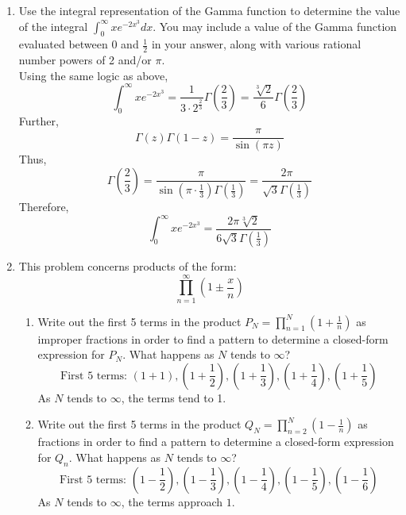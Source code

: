 \documentclass{article}
\begin{document}
\begin{enumerate}
    \[\]
    We derived in class that: 
    \[\int_{0}^{\infty} x^{m-1} e^{-ax^n}dx = \frac{1}{na^{\frac m n}}\Gamma\left(\frac{m}{n}\right)\]
    Plugging in, we get:
    \[\int_{0}^{\infty} x^{\frac 5 2} e^{-2x}dx = \frac{1}{1 \cdot 2^{\frac{7}{2}}}\Gamma\left(\frac{7}{2}\right) = \frac{1}{8\sqrt 2} \cdot \frac 5 2 \cdot \frac 3 2 \cdot \frac  1 2 \cdot \Gamma \left( \frac 1 2 \right) = \boxed{\frac{15\sqrt{\pi}}{64 \sqrt 2}}\]
    \item Use the integral representation of the Gamma function to determine the value of the integral $\int_{0}^{\infty} xe^{-2x^3}dx$. You may include a value of the Gamma function evaluated between $0$ and $\frac{1}{2}$ in your answer, along with various rational number powers of 2 and/or $\pi$.
    \[\]
    Using the same logic as above, 
    \[\int_{0}^{\infty} x e^{-2x^3} = \frac{1}{3\cdot2^{\frac{2}{3}}}\Gamma\left( \frac 2 3\right) = \frac{\sqrt[3]{2}}{6} \Gamma\left( \frac{2}{3}\right)\]
    Further, 
    \[\Gamma(z)\Gamma(1-z) = \frac{\pi}{\sin(\pi z)}\]
    Thus, 
    \[\Gamma\left(\frac{2}{3}\right) = \frac{\pi}{\sin (\pi \cdot \frac{1}{3}) \Gamma\left( \frac{1}{3}\right)} = \frac{2\pi}{\sqrt 3 \Gamma \left( \frac{1}{3}\right)}\]
    Therefore, 
    \[\boxed{\int_{0}^{\infty} x e^{-2x^3} = \frac{2 \pi \sqrt[3] 2}{6\sqrt 3 \Gamma(\frac{1}{3})}}\]
    \item This problem concerns products of the form:
    \[\prod_{n=1}^{\infty} \left(1 \pm \frac{x}{n}\right)\]
    \begin{enumerate}
        \item Write out the first 5 terms in the product $P_N = \prod_{n=1}^{N} \left( 1 + \frac{1}{n}\right)$ as improper fractions in order to find a pattern to determine a closed-form expression for $P_N$. What happens as $N$ tends to $\infty$?
        \[\]
        \[\text{First 5 terms: }(1+1), \left(1+\frac 1 2\right), \left(1 + \frac 1 3\right), \left(1 + \frac 1 4\right), \left(1 + \frac 1 5\right)\]
        As $N$ tends to $\infty$, the terms tend to 1.\[\]
        \item Write out the first 5 terms in the product $Q_N = \prod_{n=2}^{N}\left( 1 - \frac{1}{n}\right)$ as fractions in order to find a pattern to determine a closed-form expression for $Q_n$. What happens as $N$ tends to $\infty$?
        \[\] 
        \[\text{First 5 terms: }\left(1 - \frac 1 2 \right), \left(1 - \frac 1 3 \right), \left(1 - \frac 1 4 \right), \left(1 - \frac 1 5 \right), \left(1 - \frac 1 6 \right)\]
        As $N$ tends to $\infty$, the terms approach $1$. \[\]

\end{enumerate}
\end{enumerate}
\end{document}
